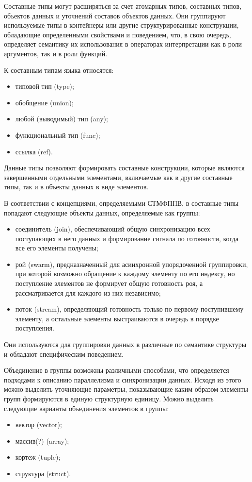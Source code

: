 {Составные типы могут расширяться за счет атомарных типов, составных типов, объектов данных и уточнений составов объектов данных. Они группируют используемые типы в контейнеры или другие структурированные конструкции, обладающие определенными свойствами и поведением, что, в свою очередь, определяет семантику их использования в операторах интерпретации как в роли аргументов, так и в роли функций.

К составным типам языка относятся:
\begin{itemize}
    \item типовой тип (type);
    \item обобщение (union);
    \item любой (выводимый) тип (any);
    \item функциональный тип (func);
    \item ссылка (ref).
\end{itemize}
Данные типы позволяют формировать составные конструкции, которые являются завершенными отдельными элементами, включаемые как в другие составные типы, так и в объекты данных в виде элементов.

В соответствии с концепциями, определяемыми СТМФППВ, в составные типы попадают следующие объекты данных, определяемые как группы:
\begin{itemize}
    \item соединитель (join), обеспечивающий общую синхронизацию всех поступающих в него данных и формирование сигнала по готовности, когда все его элементы получены;
    \item рой (swarm), предназначенный для асинхронной упорядоченной группировки, при которой возможно обращение к каждому элементу по его индексу, но поступление элементов не формирует общую готовность роя, а рассматривается для каждого из них независимо;
    \item поток (stream), определяющий готовность только по первому поступившему элементу, а остальные элементы выстраиваются в очередь в порядке поступления.
\end{itemize}
Они используются для группировки данных в различные по семантике структуры и обладают специфическим поведением.

Объединение в группы возможны различными способами, что определяется подходами к описанию параллелизма и синхронизации данных. Исходя из этого можно выделить уточняющие параметры, показывающие каким образом элементы групп формируются в единую структурную единицу. Можно выделить следующие варианты объединения элементов в группы:
\begin{itemize}
	\item вектор (vector);
	\item массив(?) (array);
	\item кортеж (tuple);
	\item структура (struct).
\end{itemize}

}
